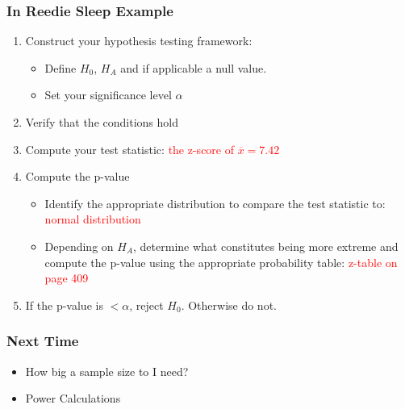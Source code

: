 \documentclass[handout]{beamer}
\newcommand{\blue}[1]{\textcolor{blue2}{#1}}
\newcommand{\xbar}{\overline{x}}
\begin{document}
\begin{frame}
\frametitle{In Reedie Sleep Example}
\begin{enumerate}
\pause\item Construct your hypothesis testing framework:
\begin{itemize}
\item Define $H_0$, $H_A$ and if applicable a null value.
\item Set your significance level $\alpha$
\end{itemize}
\pause\item Verify that the conditions hold
\pause\item Compute your \blue{test statistic}: \textcolor{red}{the z-score of $\xbar=7.42$}
\pause\item Compute the p-value
\begin{itemize}
\item Identify the appropriate distribution to compare the test statistic to:  \textcolor{red}{normal distribution}
\item Depending on $H_A$, determine what constitutes being \blue{more extreme} and compute the p-value using the appropriate probability table: \textcolor{red}{z-table on page 409}
\end{itemize}
\pause\item If the p-value is $<\alpha$, reject $H_0$.  Otherwise do not.
\end{enumerate}

\end{frame}


\begin{frame}[fragile]
\frametitle{Next Time}

\begin{itemize}
\item How big a sample size to I need?
\item Power Calculations
\
\end{itemize}

\end{frame}
\end{document}
